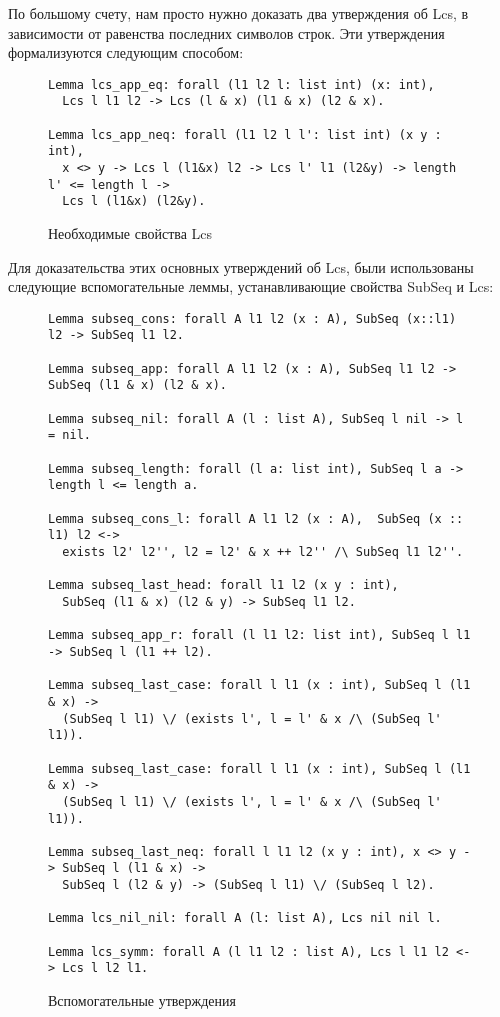 По большому счету, нам просто нужно доказать два утверждения об Lcs, в зависимости от равенства последних символов строк. Эти утверждения
формализуются следующим способом:
\begin{figure}[H]
  \caption{Необходимые свойства Lcs}
  \label{code:lcs_main_lemma}
  \begin{verbatim}
Lemma lcs_app_eq: forall (l1 l2 l: list int) (x: int),
  Lcs l l1 l2 -> Lcs (l & x) (l1 & x) (l2 & x). 

Lemma lcs_app_neq: forall (l1 l2 l l': list int) (x y : int),
  x <> y -> Lcs l (l1&x) l2 -> Lcs l' l1 (l2&y) -> length l' <= length l ->
  Lcs l (l1&x) (l2&y). 
  \end{verbatim}
\end{figure}
Для доказательства этих основных утверждений об Lcs, были использованы следующие вспомогательные леммы, устанавливающие свойства
SubSeq и Lcs:
\begin{figure}[H]
  \caption{Вспомогательные утверждения}
  \label{code:lcs_other_lemma}
  \begin{verbatim}
Lemma subseq_cons: forall A l1 l2 (x : A), SubSeq (x::l1) l2 -> SubSeq l1 l2. 

Lemma subseq_app: forall A l1 l2 (x : A), SubSeq l1 l2 -> SubSeq (l1 & x) (l2 & x). 

Lemma subseq_nil: forall A (l : list A), SubSeq l nil -> l = nil. 

Lemma subseq_length: forall (l a: list int), SubSeq l a -> length l <= length a. 

Lemma subseq_cons_l: forall A l1 l2 (x : A),  SubSeq (x :: l1) l2 <-> 
  exists l2' l2'', l2 = l2' & x ++ l2'' /\ SubSeq l1 l2''. 

Lemma subseq_last_head: forall l1 l2 (x y : int), 
  SubSeq (l1 & x) (l2 & y) -> SubSeq l1 l2. 

Lemma subseq_app_r: forall (l l1 l2: list int), SubSeq l l1 -> SubSeq l (l1 ++ l2). 

Lemma subseq_last_case: forall l l1 (x : int), SubSeq l (l1 & x) ->
  (SubSeq l l1) \/ (exists l', l = l' & x /\ (SubSeq l' l1)). 

Lemma subseq_last_case: forall l l1 (x : int), SubSeq l (l1 & x) ->
  (SubSeq l l1) \/ (exists l', l = l' & x /\ (SubSeq l' l1)). 

Lemma subseq_last_neq: forall l l1 l2 (x y : int), x <> y -> SubSeq l (l1 & x) -> 
  SubSeq l (l2 & y) -> (SubSeq l l1) \/ (SubSeq l l2). 

Lemma lcs_nil_nil: forall A (l: list A), Lcs nil nil l. 

Lemma lcs_symm: forall A (l l1 l2 : list A), Lcs l l1 l2 <-> Lcs l l2 l1. 
  \end{verbatim}
\end{figure}

